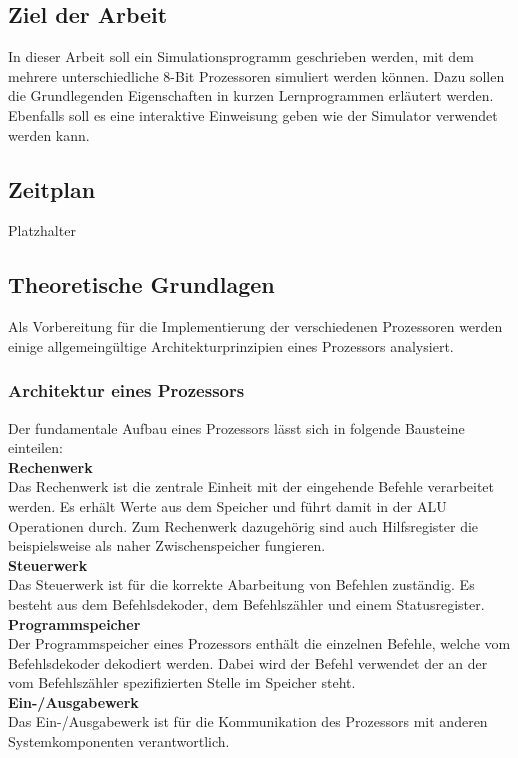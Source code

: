 \documentclass[12pt]{article}
\begin{document}
\subsection{Ziel der Arbeit}
In dieser Arbeit soll ein Simulationsprogramm geschrieben werden, mit dem mehrere unterschiedliche 8-Bit Prozessoren simuliert werden können. Dazu sollen die Grundlegenden Eigenschaften in kurzen Lernprogrammen erläutert werden. Ebenfalls soll es eine interaktive Einweisung geben wie der Simulator verwendet werden kann.

\subsection{Zeitplan}
Platzhalter

\newpage

\subsection{Theoretische Grundlagen}
Als Vorbereitung für die Implementierung der verschiedenen Prozessoren werden einige allgemeingültige Architekturprinzipien eines Prozessors analysiert. 

\subsubsection{Architektur eines Prozessors}
Der fundamentale Aufbau eines Prozessors lässt sich in folgende Bausteine einteilen:\\
\textbf{Rechenwerk}\\
Das Rechenwerk ist die zentrale Einheit mit der eingehende Befehle verarbeitet werden. Es erhält Werte aus dem Speicher und führt damit in der ALU Operationen durch. Zum Rechenwerk dazugehörig sind auch Hilfsregister die beispielsweise als naher Zwischenspeicher fungieren.\\
\textbf{Steuerwerk}\\
Das Steuerwerk ist für die korrekte Abarbeitung von Befehlen zuständig. Es besteht aus dem Befehlsdekoder, dem Befehlszähler und einem Statusregister.\\
\textbf{Programmspeicher}\\
Der Programmspeicher eines Prozessors enthält die einzelnen Befehle, welche vom Befehlsdekoder dekodiert werden. Dabei wird der Befehl verwendet der an der vom Befehlszähler spezifizierten Stelle im Speicher steht.\\
\textbf{Ein-/Ausgabewerk}\\
Das Ein-/Ausgabewerk ist für die Kommunikation des Prozessors mit anderen Systemkomponenten verantwortlich.\\
\end{document}
